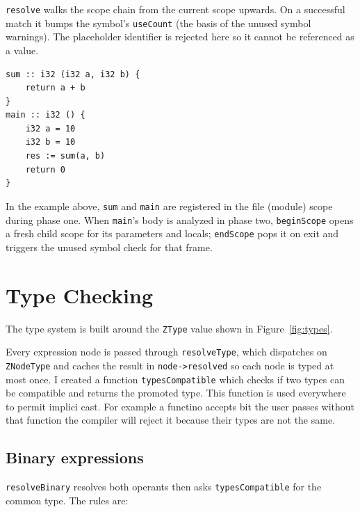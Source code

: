 \texttt{resolve} walks the scope chain from the current scope upwards. On a successful match it bumps the symbol's \texttt{useCount} (the basis of the unused symbol warnings).
The placeholder identifier \zn{_} is rejected here so it cannot be referenced as a value.

\begin{lstlisting}[style=zinc]
sum :: i32 (i32 a, i32 b) {
    return a + b
}
main :: i32 () {
    i32 a = 10
    i32 b = 10
    res := sum(a, b)
    return 0
}
\end{lstlisting}

In the example above, \texttt{sum} and \texttt{main} are registered in the file (module) scope during phase one. When \texttt{main}'s body is analyzed in phase two, \texttt{beginScope} opens a fresh child scope for its parameters and locals; \texttt{endScope} pops it on exit and triggers the unused symbol check for that frame.

\section{Type Checking}
The type system is built around the \texttt{ZType} value shown in Figure~\ref{fig:types}.


Every expression node is passed through \texttt{resolveType}, which dispatches on \texttt{ZNodeType} and caches the result in \texttt{node->resolved} so each node is typed at most once.
I created a function \texttt{typesCompatible} which checks if two types can be compatible and returns the promoted type.
This function is used everywhere to permit implici cast. For example a functino accepts  bit the user passes  without that function the compiler will reject it because their types are not the same.

\subsection{Binary expressions}

\texttt{resolveBinary} resolves both operants then asks \texttt{typesCompatible} for the common type. The rules are:

